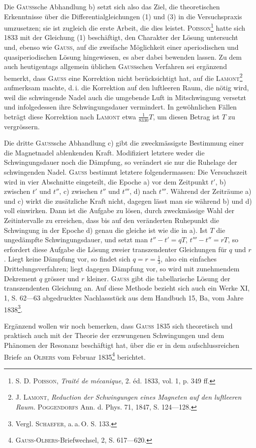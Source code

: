 Die \textsc{Gauss}sche Abhandlung b) setzt sich also das Ziel, die theoretischen Erkenntnisse
über die Differentialgleichungen (1) und (3) in die Versuchspraxis
umzusetzen; sie ist zugleich die erste Arbeit, die dies leistet. \textsc{Poisson}\footnote{\textsc{S. D. Poisson}, \textit{Traité de mécanique}, 2. éd. 1833, vol. 1, p. 349 ff.} hatte
sich 1833 mit der Gleichung (1) beschäftigt, den Charakter der Lösung untersucht
und, ebenso wie \textsc{Gauss}, auf die zweifache Möglichkeit einer aperiodischen
und quasiperiodischen Lösung hingewiesen, es aber dabei bewenden
lassen. Zu dem auch heutigentags allgemein üblichen \textsc{Gauss}schen Verfahren
sei ergänzend bemerkt, dass \textsc{Gauss} eine Korrektion nicht berücksichtigt hat,
auf die \textsc{Lamont}\footnote{\textsc{J. Lamont}, \textit{Reduction der Schwingungen eines Magneten auf den luftleeren Raum.} \textsc{Poggendorfs} Ann. d. Phys. 71, 1847, S. 124—128.} aufmerksam machte, d.\,i. die Korrektion auf den luftleeren
Raum, die nötig wird, weil die schwingende Nadel auch die umgebende Luft
in Mitschwingung versetzt und infolgedessen ihre Schwingungsdauer vermindert.
In gewöhnlichen Fällen beträgt diese Korrektion nach \textsc{Lamont} etwa \(\frac1{8330}T\),
um diesen Betrag ist \(T\) zu vergrössern.

Die dritte \textsc{Gauss}sche Abhandlung c) gibt die zweckmässigste Bestimmung
einer die Magnetnadel ablenkenden Kraft. Modifiziert letztere weder die
Schwingungsdauer noch die Dämpfung, so verändert sie nur die Ruhelage der
schwingenden Nadel. \textsc{Gauss} bestimmt letztere folgendermassen: Die Versuchszeit
wird in vier Abschnitte eingeteilt, die Epoche a) vor dem Zeitpunkt \(t'\),
b) zwischen \(t'\) und \(t''\), c) zwischen \(t''\) und \(t'''\), d) nach \(t'''\). Während der Zeiträume
a) und c) wirkt die zusätzliche Kraft nicht, dagegen lässt man sie
während b) und d) voll einwirken. Dann ist die Aufgabe zu lösen, durch zweckmässige
Wahl der Zeitintervalle zu erreichen, dass bis auf den veränderten
Ruhepunkt die Schwingung in der Epoche d) genau die gleiche ist wie die
in a). Ist \(T\) die ungedämpfte Schwingungsdauer, und setzt man \(t''-t'=qT\),
\(t'''-t''=rT\), so erfordert diese Aufgabe die Lösung zweier transzendenter
Gleichungen für \(q\) und \(r\). Liegt keine Dämpfung vor, so findet sich \(q=r=\frac13\),
also ein einfaches Drittelungsverfahren; liegt dagegen Dämpfung vor, so wird
mit zunehmendem Dekrement \(q\) grösser und \(r\) kleiner. \textsc{Gauss} gibt die
\clearpage{}
\noindent tabellarische Lösung der transzendenten Gleichung an. Auf diese Methode bezieht
sich auch ein Werke XI, 1, S. 62—63 abgedrucktes Nachlassstück aus dem
Handbuch 15, Ba, vom Jahre 1838\footnote{Vergl. \textsc{Schaefer}, a.\,a.\,O. S. 133.}.

Ergänzend wollen wir noch bemerken, dass \textsc{Gauss} 1835 sich theoretisch
und praktisch auch mit der Theorie der erzwungenen Schwingungen und dem
Phänomen der Resonanz beschäftigt hat, über die er in dem aufschlussreichen
Briefe an \textsc{Olbers} vom Februar 1835\footnote{\textsc{Gauss-Olbers}-Briefwechsel, 2, S. 617—620.} berichtet.
\clearpage\endgroup
